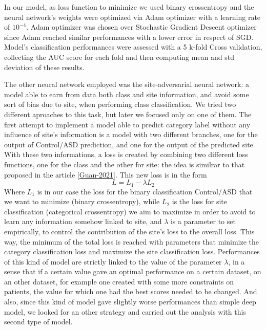 \documentclass[a4paper,11pt]{article}
\begin{document}
In our model, as loss function to minimize we used binary crossentropy and the neural network's weights were optimized via Adam optimizer with a learning rate of $10^{-4}$.
Adam optimizer was chosen over Stochastic Gradient Descent optimizer since Adam reached similar performances with a lower error in respect of SGD.
Model's classification performances were assessed with a 5 k-fold Cross validation, collecting the AUC score for each fold and then computing mean and std deviation of these results.


The other neural network employed was the site-adversarial neural network: a model able to earn from data both class and site information, and avoid some sort of bias due to site, when performing class classification.
We tried two different aproaches to this task, but later we focused only on one of them.
The first attempt to implement a model able to predict category label without any influence of site's information is a model with two different branches, one for the output of Control/ASD prediction, and one for the output of the predicted site.
With these two informations, a loss is created by combining two different loss functions, one for the class and the other for site: the idea is similrar to that proposed in the article \ref{Guan-2021}.
This new loss is in the form
\begin{equation}
L = L_1 - \lambda L_2
\end{equation}
Where $L_1$  is in our case the loss for the binary classification Control/ASD that we want to minimize (binary crossentropy), while $L_2$ is the loss for site classification (categorical crossentropy) we aim to maximize in order to avoid to learn any information somehow linked to site, and $\lambda $ is a parameter to set empirically, to control the contribution of the site's loss to the overall loss.
This way, the minimum of the total loss is reached with parameters that minimize the category classification loss and maximize the site classification loss.
Performances of this kind of model are strictly linked to the value of the parameter $\lambda$, in a sense that if a certain value gave an optimal performance on a certain dataset, on an other dataset, for example one created with some more constraints on patients, the value for which one had the best scores needed to be changed.
And also, since this kind of model gave slightly worse performances than simple deep model, we looked for an other strategy and carried out the analysis with this second type of model.
\end{document}
